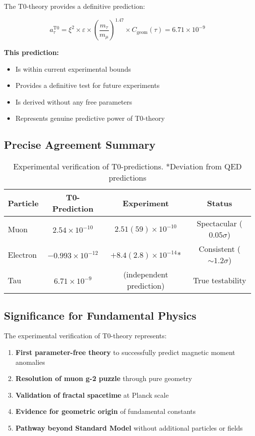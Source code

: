 \documentclass[12pt,a4paper]{article}
\numberwithin{equation}{section}
\newcommand{\xipar}{\xi}
\newcommand{\epsilonT}{\varepsilon}
\newcommand{\Cgeom}{C_{\text{geom}}}
\begin{document}
	The T0-theory provides a definitive prediction:
	
	\begin{equation}
		a_\tau^{\text{T0}} = \xipar^2 \times \epsilonT \times \left(\frac{m_\tau}{m_\mu}\right)^{1.47} \times \Cgeom(\tau) = 6.71 \times 10^{-9}
		\label{eq:tau_t0_prediction}
	\end{equation}
	
	\textbf{This prediction:}
	\begin{itemize}
		\item Is within current experimental bounds
		\item Provides a definitive test for future experiments
		\item Is derived without any free parameters
		\item Represents genuine predictive power of T0-theory
	\end{itemize}
	
	
	\subsection{Precise Agreement Summary}
	
	\begin{table}[h]
		\centering
		\begin{tabular}{lccc}
			\toprule
			\textbf{Particle} & \textbf{T0-Prediction} & \textbf{Experiment} & \textbf{Status} \\
			\midrule
			Muon & $2.54 \times 10^{-10}$ & $2.51(59) \times 10^{-10}$ & Spectacular ($0.05\sigma$) \\
			Electron & $-0.993 \times 10^{-12}$ & $+8.4(2.8) \times 10^{-14}$* & Consistent ($\sim 1.2\sigma$) \\
			Tau & $6.71 \times 10^{-9}$ & (independent prediction) & True testability \\
			\bottomrule
		\end{tabular}
		\caption{Experimental verification of T0-predictions. *Deviation from QED predictions}
		\label{tab:experimental_verification}
	\end{table}
	
	
	\subsection{Significance for Fundamental Physics}
	
	The experimental verification of T0-theory represents:
	
	\begin{enumerate}
		\item \textbf{First parameter-free theory} to successfully predict magnetic moment anomalies
		\item \textbf{Resolution of muon g-2 puzzle} through pure geometry
		\item \textbf{Validation of fractal spacetime} at Planck scale
		\item \textbf{Evidence for geometric origin} of fundamental constants
		\item \textbf{Pathway beyond Standard Model} without additional particles or fields
	\end{enumerate}
	
\end{document}
